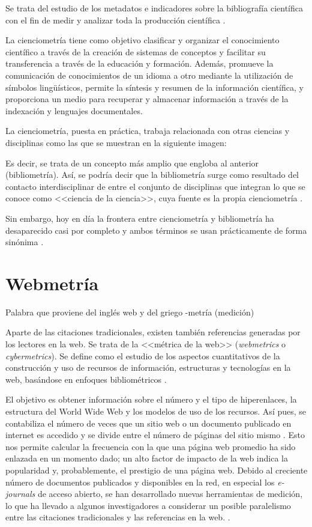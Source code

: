 Se trata del estudio de los metadatos e indicadores sobre la bibliografía científica con el fin de medir y analizar toda la producción científica \cite{Amat1989}.

La cienciometría tiene como objetivo clasificar y organizar el conocimiento científico a través de la creación de sistemas de conceptos y facilitar su transferencia a través de la educación y formación. Además, promueve la comunicación de conocimientos de un idioma a otro mediante la utilización de símbolos lingüísticos, permite la síntesis y resumen de la información científica, y proporciona un medio para recuperar y almacenar información a través de la indexación y lenguajes documentales.

La cienciometría, puesta en práctica, trabaja relacionada con otras ciencias y disciplinas como las que se muestran en la siguiente imagen:

Es decir, se trata de un concepto más amplio que engloba al anterior (bibliometría). Así, se podría decir que la bibliometría surge como resultado del contacto interdisciplinar de entre el conjunto de disciplinas que integran lo que se conoce como <<ciencia de la ciencia>>, cuya fuente es la propia cienciometría \cite{Amat1989}.

Sin embargo, hoy en día la frontera entre cienciometría y bibliometría ha desaparecido casi por completo y ambos términos se usan prácticamente de forma sinónima \cite{Vitanov2016}.

\section{Webmetría}

Palabra que proviene del inglés web y del griego -metría (medición)

Aparte de las citaciones tradicionales, existen también referencias generadas por los lectores en la web. Se trata de la <<métrica de la web>> (\textit{webmetrics} o \textit{cybermetrics}). Se define como el estudio de los aspectos cuantitativos de la construcción y uso de recursos de información, estructuras y tecnologías en la web, basándose en enfoques bibliométricos \cite{bjorneborn2004}. 


El objetivo es obtener información sobre el número y el tipo de hiperenlaces, la estructura del World Wide Web y los modelos de uso de los recursos. Así pues, se contabiliza el número de veces que un sitio web o un documento publicado en internet es accedido y se divide entre el número de páginas del sitio mismo \cite{Turbanti2017}. Esto nos permite calcular la frecuencia con la que una página web promedio ha sido enlazada en un momento dado; un alto factor de impacto de la web indica la popularidad y, probablemente, el prestigio de una página web. Debido al creciente número de documentos publicados y disponibles en la red, en especial los \textit{e-journals} de acceso abierto, se han desarrollado nuevas herramientas de medición, lo que ha llevado a algunos investigadores a considerar un posible paralelismo entre las citaciones tradicionales y las referencias en la web. \cite{Turbanti2017}.

